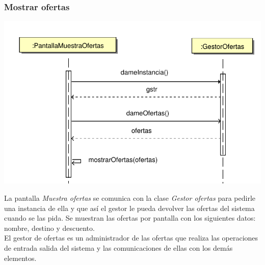 \documentclass[11pt, a4paper, twoside, titlepage]{article}
\begin{document}
			\subsubsection{Mostrar ofertas}
				\begin{center}
					\includegraphics[scale=.8]{diseno/diagramas/mostrarofertas.pdf}
				\end{center}

				La pantalla {\itshape Muestra ofertas} se comunica con la clase {\itshape Gestor ofertas} para pedirle una instancia de ella y que así el gestor le pueda devolver las ofertas del sistema cuando se las pida. Se muestran las ofertas por pantalla con los siguientes datos: nombre, destino y descuento. \\
				
				El gestor de ofertas es un administrador de las ofertas que realiza las operaciones de entrada salida del sistema y las comunicaciones de ellas con los demás elementos.
\end{document}
